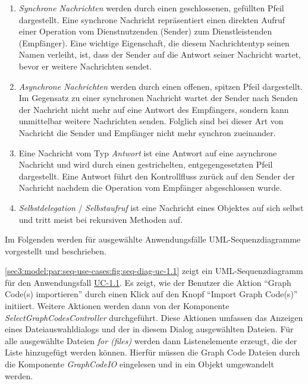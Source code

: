 \begin{enumerate}[label=(\roman{enumi})]
    \item \textit{Synchrone Nachrichten} werden durch einen geschlossenen, gefüllten Pfeil  dargestellt.
    Eine synchrone Nachricht repräsentiert einen direkten Aufruf einer Operation vom Dienstnutzenden (Sender) zum Dienstleistenden (Empfänger).
    Eine wichtige Eigenschaft, die diesem Nachrichtentyp seinen Namen verleiht, ist, dass der Sender auf die Antwort seiner Nachricht wartet, bevor er weitere Nachrichten sendet.
    \item \textit{Asynchrone Nachrichten} werden durch einen offenen, spitzen Pfeil  dargestellt.
    Im Gegensatz zu einer synchronen Nachricht wartet der Sender nach Senden der Nachricht nicht mehr auf eine Antwort des Empfängers, sondern kann unmittelbar weitere Nachrichten senden.
    Folglich sind bei dieser Art von Nachricht die Sender und Empfänger nicht mehr synchron zueinander.
    \item Eine Nachricht vom Typ \textit{Antwort} ist eine Antwort auf eine asynchrone Nachricht und wird durch einen gestrichelten, entgegengesetzten Pfeil  dargestellt.
    Eine Antwort führt den Kontrollfluss zurück auf den Sender der Nachricht nachdem die Operation vom Empfänger abgeschlossen wurde.
    \item \textit{Selbstdelegation} / \textit{Selbstaufruf} ist eine Nachricht eines Objektes auf sich selbst und tritt meist bei rekursiven Methoden auf.
\end{enumerate}

Im Folgenden werden für ausgewählte Anwendungsfälle UML-Sequenzdiagramme vorgestellt und beschrieben.



\cref{sec3:model:par:seq-use-cases:fig:seq-diag-uc-1.1} zeigt ein UML-Sequenzdiagramm für den Anwendungsfall \hyperref[sec3:model:uc-1.1]{UC-1.1}.
Es zeigt, wie der Benutzer die Aktion \enquote{Graph Code(s) importieren} durch einen Klick auf den Knopf \enquote{Import Graph Code(s)} initiiert.
Weitere Aktionen werden dann von der Komponente \textit{SelectGraphCodesController} durchgeführt.
Diese Aktionen umfassen das Anzeigen eines Dateiauswahldialogs und der in diesem Dialog ausgewählten Dateien.
Für alle ausgewählte Dateien \textit{for (files)} werden dann Listenelemente erzeugt, die der Liste hinzugefügt werden können.
Hierfür müssen die Graph Code Dateien durch die Komponente \textit{GraphCodeIO} eingelesen und in ein Objekt umgewandelt werden.

